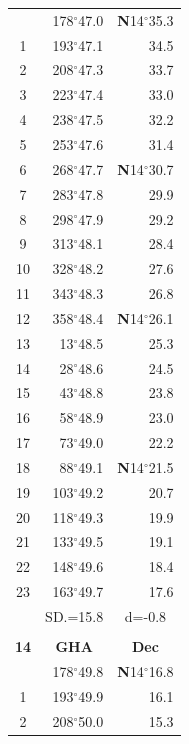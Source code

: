 \documentclass[10pt, a4paper]{report}
\begin{document}
\begin{scriptsize}
\begin{tabular*}{0.2\textwidth}[t]{@{\extracolsep{\fill}}|c|rr|}
\hline\rule{0pt}{2.6ex}\noindent
0 & 178$^\circ$47.0 & \textbf{N}14$^\circ$35.3\\
1 & 193$^\circ$47.1 & 34.5\\
2 & 208$^\circ$47.3 & 33.7\\
3 & 223$^\circ$47.4 & \raisebox{0.24ex}{\boldmath$\cdot$~\boldmath$\cdot$~~}33.0\\
4 & 238$^\circ$47.5 & 32.2\\
5 & 253$^\circ$47.6 & 31.4\\[2Pt]
6 & 268$^\circ$47.7 & \textbf{N}14$^\circ$30.7\\
7 & 283$^\circ$47.8 & 29.9\\
8 & 298$^\circ$47.9 & 29.2\\
9 & 313$^\circ$48.1 & \raisebox{0.24ex}{\boldmath$\cdot$~\boldmath$\cdot$~~}28.4\\
10 & 328$^\circ$48.2 & 27.6\\
11 & 343$^\circ$48.3 & 26.8\\[2Pt]
12 & 358$^\circ$48.4 & \textbf{N}14$^\circ$26.1\\
13 & 13$^\circ$48.5 & 25.3\\
14 & 28$^\circ$48.6 & 24.5\\
15 & 43$^\circ$48.8 & \raisebox{0.24ex}{\boldmath$\cdot$~\boldmath$\cdot$~~}23.8\\
16 & 58$^\circ$48.9 & 23.0\\
17 & 73$^\circ$49.0 & 22.2\\[2Pt]
18 & 88$^\circ$49.1 & \textbf{N}14$^\circ$21.5\\
19 & 103$^\circ$49.2 & 20.7\\
20 & 118$^\circ$49.3 & 19.9\\
21 & 133$^\circ$49.5 & \raisebox{0.24ex}{\boldmath$\cdot$~\boldmath$\cdot$~~}19.1\\
22 & 148$^\circ$49.6 & 18.4\\
23 & 163$^\circ$49.7 & 17.6\\
\hline
\rule{0pt}{2.4ex} & \multicolumn{1}{c}{SD.=15.8} & \multicolumn{1}{c|}{d=-0.8}\\
\hline
\multicolumn{1}{c}{}\\[-0.5ex]\hline
\multicolumn{1}{|c|}{\rule{0pt}{2.6ex}\textbf{14}} & \multicolumn{1}{c}{\textbf{GHA}} & \multicolumn{1}{c|}{\textbf{Dec}}\\
\hline\rule{0pt}{2.6ex}\noindent
0 & 178$^\circ$49.8 & \textbf{N}14$^\circ$16.8\\
1 & 193$^\circ$49.9 & 16.1\\
2 & 208$^\circ$50.0 & 15.3\\

\end{tabular*}
\end{scriptsize}
\end{document}
